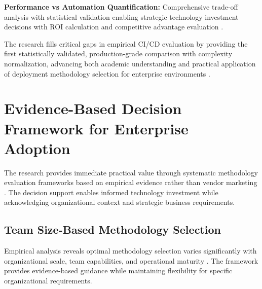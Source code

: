 \textbf{Performance vs Automation Quantification:} Comprehensive trade-off analysis with statistical validation enabling strategic technology investment decisions with ROI calculation and competitive advantage evaluation \cite{automation_benefits,performance_tradeoffs}.

The research fills critical gaps in empirical CI/CD evaluation by providing the first statistically validated, production-grade comparison with complexity normalization, advancing both academic understanding and practical application of deployment methodology selection for enterprise environments \cite{cicd_research_gaps,enterprise_deployment_practices}.

\section{Evidence-Based Decision Framework for Enterprise Adoption}
\label{sec:decision_framework}

The research provides immediate practical value through systematic methodology evaluation frameworks based on empirical evidence rather than vendor marketing \cite{evidence_based_decisions,enterprise_technology_adoption}. The decision support enables informed technology investment while acknowledging organizational context and strategic business requirements.

\subsection{Team Size-Based Methodology Selection}
\label{subsec:team_size_selection}

Empirical analysis reveals optimal methodology selection varies significantly with organizational scale, team capabilities, and operational maturity \cite{organizational_factors,team_scaling_patterns}. The framework provides evidence-based guidance while maintaining flexibility for specific organizational requirements.

